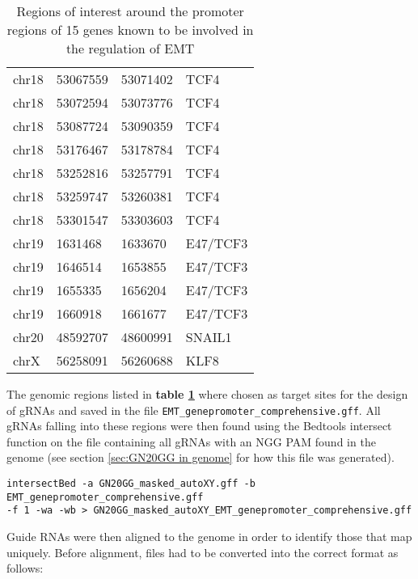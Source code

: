 \begin{table}[H]
\begin{center}
\begin{footnotesize}
\begin{tabular}{llll}
chr18 & 53067559 & 53071402	& TCF4 \\
chr18 & 53072594 & 53073776	& TCF4 \\
chr18 & 53087724 & 53090359	& TCF4 \\
chr18 & 53176467 & 53178784	& TCF4 \\
chr18 & 53252816 & 53257791	& TCF4 \\
chr18 & 53259747 & 53260381	& TCF4 \\
chr18 & 53301547 & 53303603	& TCF4 \\
chr19 & 1631468	 & 1633670	& E47/TCF3 \\
chr19 & 1646514	 & 1653855	& E47/TCF3 \\
chr19 & 1655335	 & 1656204	& E47/TCF3 \\
chr19 & 1660918	 & 1661677	& E47/TCF3  \\
chr20 & 48592707 & 48600991 & SNAIL1  \\
chrX & 56258091 & 56260688 &KLF8 \\
\hline
\end{tabular}
\caption{Regions of interest around the promoter regions of 15 genes known to be involved in the regulation of EMT \cite{DeCraene:2013kb}}
\label{tab:EMT5000-targets}
\end{footnotesize}
\end{center}
\end{table}


The genomic regions listed in \textbf{table \ref{tab:EMT5000-targets}} where chosen as target sites for the design of gRNAs  and saved in the file \verb|EMT_genepromoter_comprehensive.gff|. All gRNAs falling into these regions were then found using the Bedtools \cite{Quinlan:2010km} intersect function on the file containing all gRNAs with an NGG PAM found in the genome (see section \ref{sec:GN20GG in genome} for how this file was generated).

\begin{lstlisting}
intersectBed -a GN20GG_masked_autoXY.gff -b EMT_genepromoter_comprehensive.gff
-f 1 -wa -wb > GN20GG_masked_autoXY_EMT_genepromoter_comprehensive.gff
\end{lstlisting}

Guide RNAs were then aligned to the genome in order to identify those that map uniquely. Before alignment, files had to be converted into the correct format as follows:

